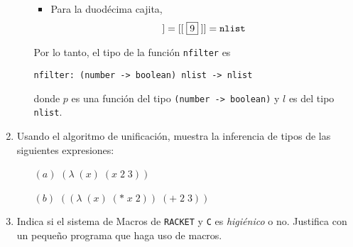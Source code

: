 \documentclass[letterpaper,11pt]{article}
\begin{document}
\begin{enumerate}
\begin{enumerate}
\begin{itemize}
            \item Para la duodécima cajita, 
            \begin{equation*}
                [[\;\fbox{12}\;]] = [[\;\fbox{9}\;]] = \texttt{nlist}
            \end{equation*}
        \end{itemize}

        Por lo tanto, el tipo de la función \texttt{nfilter} es 
        \begin{center}
            \texttt{nfilter: (number -> boolean) nlist -> nlist}
        \end{center}

        donde $p$ es una función del tipo \texttt{(number -> boolean)}
        y $l$ es del tipo \texttt{nlist}.
    \end{enumerate}


    \item Usando el algoritmo de unificación, muestra la inferencia de tipos de las siguientes expresiones:
    \begin{itemize}
        \item [$(a)$] $(\lambda\; (x)\; (x\; 2\; 3))$
        \item [$(b)$] $((\lambda\; (x)\; (*\; x\; 2))\; (+\; 2\; 3))$
    \end{itemize}
    \item Indica si el sistema de Macros de \texttt{RACKET} y \texttt{C} es \textit{higiénico} o no. Justifica con un pequeño programa que haga uso de macros.
\end{enumerate}
\end{document}
